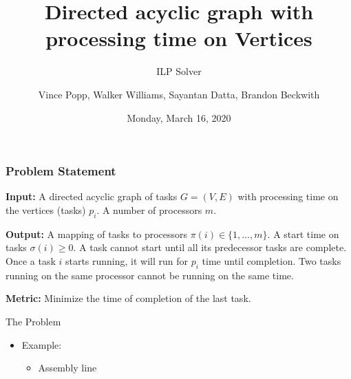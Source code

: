 \documentclass[10pt]{beamer}
\title{Directed acyclic graph with processing time on Vertices}
\subtitle{ILP Solver}
\author{Vince Popp, Walker Williams, Sayantan Datta, Brandon Beckwith}
\institute{ITCS 6115 / 8115 : Spring 2020}
\date{Monday, March 16, 2020}
\begin{document}
 
\frame{\titlepage}
 
\begin{frame}
\frametitle{Problem Statement}
\textbf{Input:} A directed acyclic graph of tasks $G = (V, E)$ with processing time on the vertices (tasks) $p_i$. A number of processors $m$.
\medskip

\textbf{Output:} A mapping of tasks to processors $\pi(i) \in \{1, \ldots, m \}$. A start time on tasks $\sigma(i) \geq 0$. A task cannot start until all its predecessor tasks are complete. Once a task $i$ starts running, it will run for $p_i$ time until completion. Two tasks running on the same processor cannot be running on the same time.
\medskip

\textbf{Metric:} Minimize the time of completion of the last task.
\end{frame}

\begin{frame}{The Problem}
    \begin{itemize}
        \item Example:
        \begin{itemize}
            \item Assembly line
        \end{itemize}
    \end{itemize}
\end{frame}

        
        
        
\end{document}
